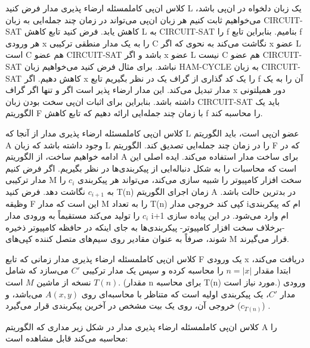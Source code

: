 \begin{itemframe-s}{کلاس ان‌پی کامل}{مسئله ارضاء پذیری مدار}
\itm
فرض کنید L یک زبان دلخواه در ان‌پی باشد، می‌خواهیم ثابت کنیم هر زبان ان‌پی می‌تواند در زمان چند جمله‌ایی به زبان CIRCUIT-SAT کاهش یابد. فرض کنید تابع کاهش L به CIRCUIT-SAT را f بنامیم.
\itm
بنابراین تابع f هر ورودی x را به یک مدار منطقی ترکیبی C نگاشت می‌کند به نحوی که اگر x عضو L است C هم عضو CIRCUIT-SAT باشد و اگر x عضو L نیست C هم عضو CIRCUIT-SAT نباشد.
\itm
برای مثال فرض کنید می‌خواهیم زبان HAM-CYCLE به زبان CIRCUIT-SAT کاهش دهیم. اگر x را یک کد گذاری از گراف یک در نظر بگیریم تابع f آن را به یک مدار تبدیل می‌کند. این مدار ارضاء پذیر است اگر و تنها اگر گراف x دور همیلتونی داشته باشد.
\itm
بنابراین برای اثبات ان‌پی سخت بودن زبان CIRCUIT-SAT باید یک الگوریتم F با زمان چند جمله‌ایی ارائه دهیم که تابع کاهش f را محاسبه کند.
\end{itemframe-s}


\begin{itemframe-s}{کلاس ان‌پی کامل}{مسئله ارضاء پذیری مدار}
\itm
از آنجا که L عضو ان‌پی است، باید الگوریتم A وجود داشته باشد که زبان L را در زمان چند جمله‌ایی تصدیق کند. الگوریتم F که در ادامه خواهیم ساخت، از الگوریتم A برای ساخت مدار استفاده می‌کند.
\itm
ایده اصلی این است که محاسبات را به شکل دنباله‌ایی از پیکربندی‌ها در نظر بگیریم. اگر فرض کنیم مدار ترکیبی M سخت افزار کامپیوتر را شبیه سازی می‌کند، می‌تواند هر پیکربندی $c_i$ را به $ c_{i+1}$ نگاشت دهد.
\itm
فرض کنید T(n) زمان اجرای الگوریتم A  در بدترین حالت باشد. وظیقه F این است که مدار M را به تعداد T(n) کپی کند خروجی مدار iام که پیکربندی $c_i$ را تولید می‌کند مستقیماً به ورودی مدار i+1 ام وارد می‌شود.
\itm
در این پیاده سازی -برخلاف سخت افزار کامپیوتر- پیکربندی‌ها به جای اینکه در حافظه کامپیوتر ذخیره شوند، صرفاً به عنوان مقادیر روی سیم‌های متصل کننده کپی‌های M قرار می‌گیرند.
\end{itemframe-s}


\begin{itemframe-s}{کلاس ان‌پی کامل}{مسئله ارضاء پذیری مدار}
\itm
زمانی که تابع F یک ورودی x دریافت می‌کند، ابتدا مقدار
 $n = |x|$
را محاسبه کرده و سپس یک مدار ترکیبی $C'$ می‌سازد که شامل $T(n)$ نسخه از ماشین $M$ است. (مقدار n برای محاسبه T(n) مورد نیاز است.)
\itm
ورودی مدار $C'$، یک پیکربندی اولیه است که متناظر با محاسبه‌ای روی $A(x, y)$ می‌باشد، و خروجی آن، روی یک بیت مشخص در آخرین پیکربندی قرار می‌گیرد ($c_{T(n)}$) .

\end{itemframe-s}


\begin{itemframe-s}{کلاس ان‌پی کامل}{مسئله ارضاء پذیری مدار}
\itm
در شکل زیر مداری که الگوریتم A را محاسبه می‌کند قابل مشاهده است:

\end{itemframe-s}


